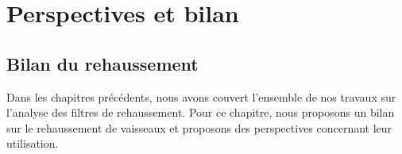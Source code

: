 \chapter{Perspectives et bilan}
\label{sec:Ending}

\section{Bilan du rehaussement}

Dans les chapitres précédents, nous avons couvert l'ensemble de nos travaux sur l'analyse des filtres de rehaussement. Pour ce chapitre, nous proposons un bilan sur le rehaussement de vaisseaux et proposons des perspectives concernant leur utilisation. 




